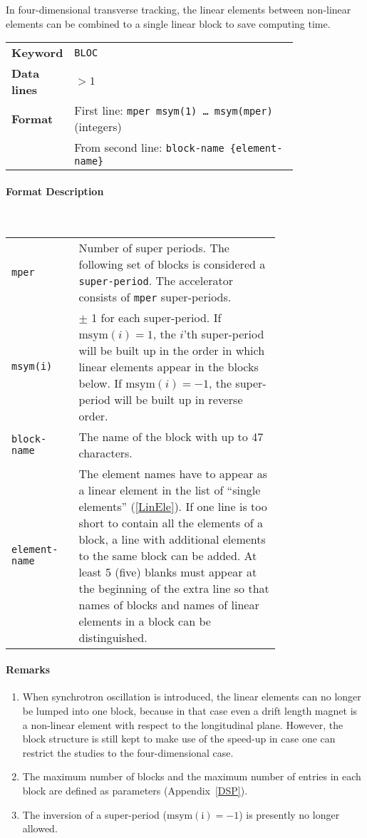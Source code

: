 In four-dimensional transverse tracking, the linear elements between non-linear elements can be combined to a single linear block to save computing time.

\bigskip
\begin{tabular}{@{}lp{0.8\linewidth}}
    \textbf{Keyword}    & \texttt{BLOC} \\
    \textbf{Data lines} & $>1$ \\
    \textbf{Format}     & First line: \texttt{mper msym(1) \dots~msym(mper)} (integers) \\
                        & From second line: \texttt{block-name \{element-name\}}
\end{tabular}

\paragraph{Format Description}~

\bigskip
\begin{longtabu}{@{}lp{0.75\linewidth}}
    \texttt{mper} & Number of super periods. The following set of blocks is considered a \texttt{super-period}. The accelerator consists of \texttt{mper} super-periods. \\
    \texttt{msym(i)} & $\pm$ 1 for each super-period. If $\mathrm{msym}(i)=1$, the \mbox{$i$'th} super-period will be built up in the order in which linear elements appear in the blocks  below. If $\mathrm{msym}(i)=-1$, the super-period will be built up in reverse order. \\
    \texttt{block-name} & The name of the block with up to 47 characters. \\
    \texttt{element-name} & The element names have to appear as a linear element in the list of ``single elements'' (\ref{LinEle}). If one line is too short to contain all the elements of a block, a line with additional elements to the same block can be added. At least 5 (five) blanks must appear at the beginning of the extra line so that names of blocks and names of linear elements in a block can be distinguished.
\end{longtabu}

\paragraph{Remarks}
\begin{enumerate}
    \item When synchrotron oscillation is introduced, the linear elements can no longer be lumped into one block, because in that case even a drift length magnet is a non-linear element with respect to the longitudinal plane. However, the block structure is still kept to make use of the speed-up in case one can restrict the studies to the four-dimensional case.
    \item The maximum number of blocks and the maximum number of entries in each block are defined as parameters (Appendix~\ref{DSP}).
    \item The inversion of a super-period ($\mathrm{msym(i)} = -1$) is presently no longer allowed.
\end{enumerate}

